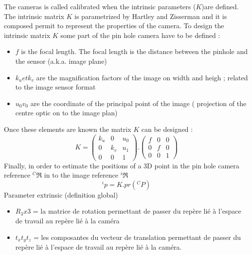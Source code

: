 The cameras is called calibrated when the intrinsic parameters ($K$)are defined.  
 The intrinsic matrix $K$ is parametrized by Hartley and Zisserman and it is composed permit to represent the properties of the camera. To design the intrinsic matrix $K$ some part of the pin hole camera have to be defined :\\
  \begin{itemize}
  
 	\item $f$ is  the focal length. The focal length is the distance between the pinhole and the sensor (a.k.a. image plane)
  	\item $k_u et k_v$ are the magnification factors of the image on width and heigh ; related to the image sensor format%
  	\item $u_0 v_0$  are the coordinate  of  the principal point of the image ( projection of the centre optic on to the image plan)  %
  	  \end{itemize}
		Once these elements are known the matrix $K$ can be designed :
	\begin{equation}
		K=
		\begin{pmatrix}
			k_u 	& 0 	& u_0 \\
			0 		& k_v	& u_1\\
			0 		&	0	& 1
		\end{pmatrix} .
		\begin{pmatrix}
			f 		& 0 	& 0  \\
			0 		& f		& 0  \\
			0 		&	0	& 1  
		\end{pmatrix} 
	\label{eq:K}
	\end{equation}
Finally, in order to estimate the positions of a 3D point in the pin hole camera reference $^C\Re$ in to the image reference $^i\Re$ 
$$
^ip=K.pr(^CP)
$$ 	  
 Parameter extrinsic (definition global) \\
  \begin{itemize}
 	\item$R_3x3$ = la matrice de rotation permettant de passer du repère lié à l'espace de travail au repère lié à la caméra\\
 	\item$t_x t_y t_z$ = les composantes du vecteur de translation permettant de passer du repère lié à l'espace de travail au repère lié à la caméra.\\
  \end{itemize}
 
